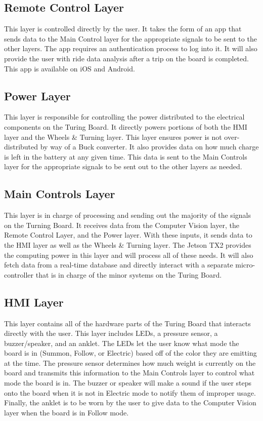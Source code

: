 \subsection{Remote Control Layer}
This layer is controlled directly by the user. It takes the form of an app that sends data to the Main Control layer for the appropriate signals to be sent to the other layers. The app requires an authentication process to log into it. It will also provide the user with ride data analysis after a trip on the board is completed. This app is available on iOS and Android.

\subsection{Power Layer}
This layer is responsible for controlling the power distributed to the electrical components on the Turing Board. It directly powers portions of both the HMI layer and the Wheels \& Turning layer. This layer ensures power is not over-distributed by way of a Buck converter. It also provides data on how much charge is left in the battery at any given time. This data is sent to the Main Controls layer for the appropriate signals to be sent out to the other layers as needed.

\subsection{Main Controls Layer}
This layer is in charge of processing and sending out the majority of the signals on the Turning Board. It receives data from the Computer Vision layer, the Remote Control Layer, and the Power layer. With these inputs, it sends data to the HMI layer as well as the Wheels \& Turning layer. The Jetson TX2 provides the computing power in this layer and will process all of these needs. It will also fetch data from a real-time database and directly interact with a separate micro-controller that is in charge of the minor systems on the Turing Board.

\subsection{HMI Layer}
This layer contains all of the hardware parts of the Turing Board that interacts directly with the user. This layer includes LEDs, a pressure sensor, a buzzer/speaker, and an anklet. The LEDs let the user know what mode the board is in (Summon, Follow, or Electric) based off of the color they are emitting at the time. The pressure sensor determines how much weight is currently on the board and transmits this information to the Main Controls layer to control what mode the board is in. The buzzer or speaker will make a sound if the user steps onto the board when it is not in Electric mode to notify them of improper usage. Finally, the anklet is to be worn by the user to give data to the Computer Vision layer when the board is in Follow mode.

